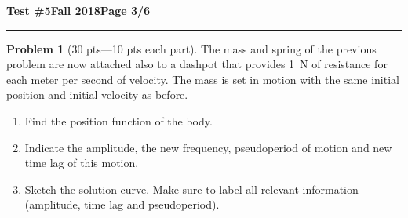 \documentclass[12pt]{article}
\theoremstyle{definition}
\newtheorem{problem}{Problem}
\begin{document}
\newpage

\hfill{\large\bf Test \#5}\hfill{\large\bf Fall 2018}\hfill{\large\bf Page 3/6}\hrule

\bigskip
\begin{problem}[30 pts---10 pts each part]
  The mass and spring of the previous problem are now attached also to a dashpot that provides 1~N of resistance for
  each meter per second of velocity.  The mass is set in motion with the same initial position and initial velocity as
  before.
  \begin{enumerate}
  \item Find the position function of the body.
    \vspace{3cm}
    \begin{flushright}
    \end{flushright}
  \item Indicate the amplitude, the new frequency, pseudoperiod of motion and new time lag of this motion.
    \vspace{3cm}
    \begin{flushright}
    \end{flushright}
  \item Sketch the solution curve.  Make sure to label all relevant information (amplitude, time lag and pseudoperiod).
  \end{enumerate}
\end{problem} 
\newpage
\end{document}
